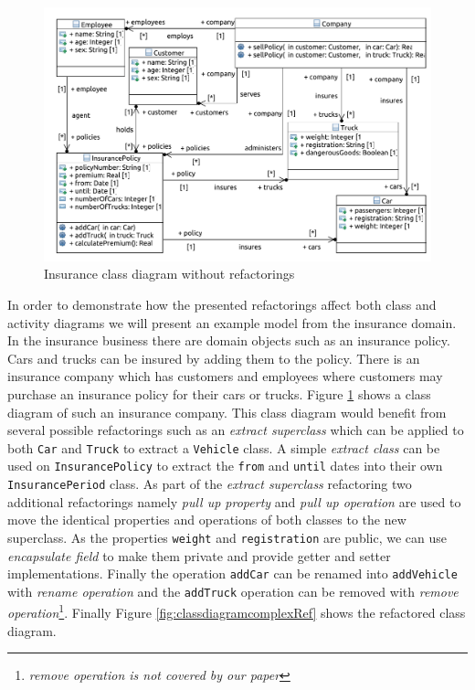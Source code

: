 \documentclass{llncs}
\begin{document}
\begin{figure}[h!t]
 \centering
 \includegraphics[scale=0.5]{images/insurance/Model_Model_ClassDiagram.PDF}
 \caption{Insurance class diagram without refactorings}
 \label{fig:classdiagramcomplex}
\end{figure}

In order to demonstrate how the presented refactorings affect both class and activity diagrams we will present an example 
model from the insurance domain. In the insurance business there are domain objects such as an insurance policy. Cars and 
trucks can be insured by adding them to the policy. There is an insurance company which has customers and employees where customers may purchase an insurance policy 
for their cars or trucks. Figure \ref{fig:classdiagramcomplex} shows a class diagram of such an insurance company. This class 
diagram would benefit from several possible refactorings such as an \textit{extract superclass} which can be applied to both \lstinline|Car| 
and \lstinline|Truck| to extract a \lstinline|Vehicle| class. A simple \textit{extract class} can be used on \lstinline|InsurancePolicy| to 
extract the \lstinline|from| and \lstinline|until| dates into their own \lstinline|InsurancePeriod| class. As part of the 
\textit{extract superclass} refactoring two additional refactorings namely \textit{pull up property} and \textit{pull up operation} are 
used to move the identical properties and operations of both classes to the new superclass. As the 
properties \lstinline|weight| and \lstinline|registration| are public, we can use \textit{encapsulate field} to make them private and 
provide getter and setter implementations. Finally the operation \lstinline|addCar| can be renamed into \lstinline|addVehicle| with \textit{rename operation} 
and the \lstinline|addTruck| operation can be removed with \textit{remove operation}\footnote{\textit{remove operation is not covered by our paper}}. Finally Figure \ref{fig:classdiagramcomplexRef} shows 
the refactored class diagram.
\end{document}
